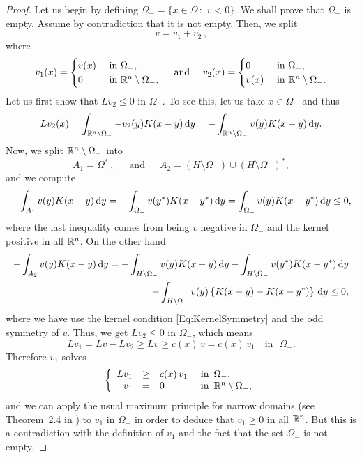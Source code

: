 \begin{proof}
	Let us begin by defining $\Omega_- = \{x\in \Omega \,:\,\, v<0\}$. We shall prove that $\Omega_-$ is empty. Assume by contradiction that it is not empty. Then, we split 
	$$ v = v_1+v_2\,, $$
	where
	\begin{equation*}
	v_1(x) = 
	\begin{cases}
	v(x)  &\textrm{ in } \Omega_-,\\
	0 &\textrm{ in } \mathbb{R}^n\setminus\Omega_-,
	\end{cases}
	\quad \text{ and } \quad
	v_2(x) = 
	\begin{cases}
	0  &\textrm{ in } \Omega_-,\\
	v(x) &\textrm{ in } \mathbb{R}^n\setminus\Omega_-.
	\end{cases}
	\end{equation*}
	Let us first show that $Lv_2\leq 0$ in $\Omega_-$. To see this, let us take $x\in\Omega_-$ and thus
	$$ 
	Lv_2(x) = \int_{\mathbb{R}^n\setminus\Omega_-} -v_2(y)K(x-y) \,\mathrm{d} y = -\int_{\mathbb{R}^n\setminus\Omega_-} v(y)K(x-y) \,\mathrm{d} y.  
	$$
	Now, we split $\mathbb{R}^n\setminus\Omega_-$ into
	$$ 
	A_1 = \Omega_-^*,\,\,\,\,\,\,\,\text{ and }\,\,\,\,\,\,\, A_2 = \left(H\setminus\Omega_-\right)\cup\left(H\setminus\Omega_-\right)^*,
	$$
	and we compute
	\begin{align*}
	-\int_{A_1} v(y)K(x-y) \,\mathrm{d} y = -\int_{\Omega_-} v(y^*)K(x-y^*) \,\mathrm{d} y  = \int_{\Omega_-} v(y)K(x-y^*) \,\mathrm{d} y \leq 0,
	\end{align*}
	where the last inequality comes from being $v$ negative in $\Omega_-$ and the kernel positive in all $\mathbb{R}^n$.
	On the other hand
	\begin{align*}
	-\int_{A_2} v(y)K(x-y) \,\mathrm{d} y = -\int_{H\setminus\Omega_-} v(y)K(x-y) \,\mathrm{d} y  -\int_{H\setminus\Omega_-} v(y^*)K(x-y^*) \,\mathrm{d} y \\ 
	= -\int_{H\setminus\Omega_-} v(y)\left\{K(x-y)-K(x-y^*)\right\} \,\mathrm{d} y \leq 0,
	\end{align*}
	where we have use the kernel condition \eqref{Eq:KernelSymmetry} and the odd symmetry of $v$. Thus, we get $Lv_2 \leq 0$ in $\Omega_-$, which means
	$$ Lv_1 = Lv-Lv_2 \geq Lv \geq c(x)\,v = c(x)\,v_1 \,\,\,\,\text{ in }\,\,\Omega_-. $$
	Therefore $v_1$ solves
	\begin{equation*}
	\left\{\begin{array}{rcll}
	Lv_1 &\geq& c(x)\,v_1   &\textrm{ in } \,\Omega_-,\\
	v_1 &=& 0 &\textrm{ in }\,\mathbb{R}^n\setminus\Omega_-,
	\end{array} \right.
	\end{equation*}
	and we can apply the usual maximum principle for narrow domains (see Theorem~2.4 in \cite{QuaasXia}) to $v_1$ in $\Omega_-$ in order to deduce that $v_1\geq 0$ in all $\mathbb{R}^n$. But this is a contradiction with the definition of $v_1$ and the fact that the set $\Omega_-$ is not empty.
\end{proof}

